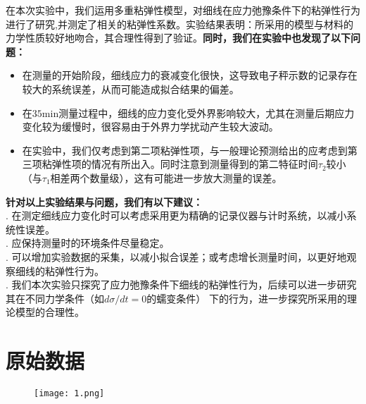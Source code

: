 \documentclass{ctexart}
\begin{document}
在本次实验中，我们运用多重粘弹性模型，对细线在应力弛豫条件下的粘弹性行为进行了研究,并测定了相关的粘弹性系数。实验结果表明：所采用的模型与材料的力学性质较好地吻合，其合理性得到了验证。\textbf{同时，我们在实验中也发现了以下问题：}
\begin{itemize}
  \item 在测量的开始阶段，细线应力的衰减变化很快，这导致电子秤示数的记录存在较大的系统误差，从而可能造成拟合结果的偏差。
  \item 在$35\mathrm{min}$测量过程中，细线的应力变化受外界影响较大，尤其在测量后期应力变化较为缓慢时，很容易由于外界力学扰动产生较大波动。
  \item 在实验中，我们仅考虑到第二项粘弹性项，与一般理论预测给出的应考虑到第三项粘弹性项的情况有所出入。同时注意到测量得到的第二特征时间$\tau_2$较小（与$\tau_1$相差两个数量级），这有可能进一步放大测量的误差。
\end{itemize}
\textbf{针对以上实验结果与问题，我们有以下建议：}\\
. 在测定细线应力变化时可以考虑采用更为精确的记录仪器与计时系统，以减小系统性误差。\\
. 应保持测量时的环境条件尽量稳定。\\
. 可以增加实验数据的采集，以减小拟合误差；或考虑增长测量时间，以更好地观察细线的粘弹性行为。\\
. 我们本次实验只探究了应力弛豫条件下细线的粘弹性行为，后续可以进一步研究其在不同力学条件（如$d\sigma/dt=0$的蠕变条件）
下的行为，进一步探究所采用的理论模型的合理性。



\section{原始数据}

\begin{figure}[htbp]
  \centering
  \texttt{[image: 1.png]}
\end{figure}
\end{document}

